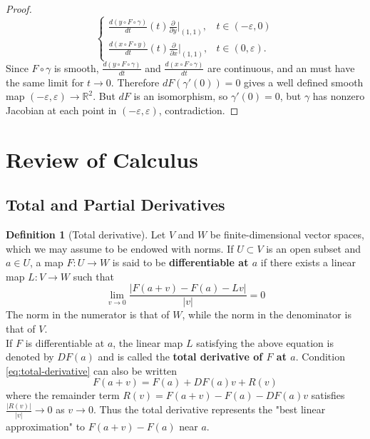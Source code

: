 \documentclass[reqno]{amsart}
\theoremstyle{plain}%
\theoremstyle{definition}
\newtheorem{definition}[theorem]{Definition}
\theoremstyle{remark}
\begin{document}
\begin{proof}
\[\begin{cases}
            \frac{d \left( y \circ F \circ \gamma \right) }{dt} (t) 
            \frac{\partial}{\partial y}|_{(1,1)}, & t \in 
            (-\varepsilon, 0)\\
            \frac{d \left( x \circ F \circ y \right) }{dt}(t)
            \frac{\partial}{\partial x}|_{(1,1)}, & t
            \in (0, \varepsilon).
        \end{cases}
        \] 
        Since $F \circ \gamma$  is smooth,
        $\frac{d \left( y \circ F \circ \gamma \right) }{dt}$ and
        $\frac{d \left( x \circ F \circ \gamma \right) }{dt}$ 
        are continuous, and an must have the same limit for
        $t \to 0$. Therefore 
        $dF \left( \gamma'(0) \right) = 0$ gives a well defined
        smooth map $\left( -\varepsilon, \varepsilon \right) \to 
        \mathbb{R}^2$. But $dF$ is an isomorphism, so
        $\gamma'(0) = 0$, but $\gamma$ has nonzero Jacobian at each point
        in $\left( -\varepsilon,\varepsilon \right) $, contradiction.
        

        
        
        
        
        
        
        
        
    \end{proof}
    



\newpage
\appendix
\section{Review of Calculus}
    \subsection*{Total and Partial Derivatives}
        \begin{definition}[Total derivative]
        Let $V$ and $W$ be finite-dimensional vector spaces, which we may assume to
        be endowed with norms. If $U \subset V$ is an open subset and
        $a \in U$, a map $F  \colon U \to W$ is said to be \textbf{differentiable
        at $a$} if there exists a linear map $L  \colon V \to W$ such that
        \begin{equation}
        \lim_{v \to 0} \frac{\left| F(a+v) - F(a) - Lv \right| }{\left| v \right|
        }=0 \label{eq:total-derivative}
        \end{equation}
        The norm in the numerator is that of $W$, while the norm in the denominator
        is that of $V$.\\
        If $F$ is differentiable at $a$, the linear map $L$ satisfying the above
        equation is denoted by $DF(a)$ and is called the \textbf{total derivative
        of $F$ at $a$}. Condition \eqref{eq:total-derivative} can also be written
        \[
        F(a+v) = F(a) + DF(a)v + R(v)
        \] 
        where the remainder term $R(v) = F(a+v) - F(a) - DF(a)v$ satisfies
        $\frac{\left| R(v) \right| }{\left| v \right| }\to 0$ as $v \to 0$. Thus
        the total derivative represents the "best linear approximation" to
        $F(a+v) - F(a)$ near $a$.
        \end{definition}
\end{document}
